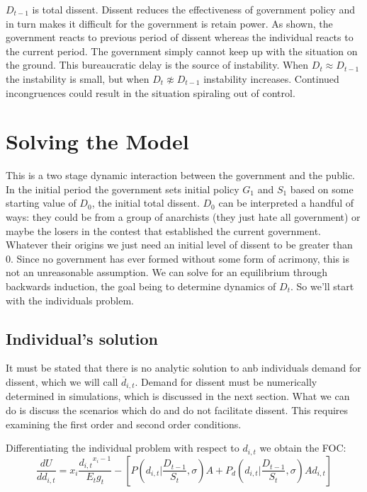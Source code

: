 \documentclass[12pt]{article}
\begin{document}
\begin{spacing}{1.5}
$D_{t-1}$ is total dissent. Dissent reduces the effectiveness of government policy and in turn makes it difficult for the government is retain power. As shown, the government reacts to previous period of dissent whereas the individual reacts to the current period. The government simply cannot keep up with the situation on the ground. This bureaucratic delay is the source of instability. When $D_t \approx D_{t-1}$ the instability is small, but when $D_t \not\approx D_{t-1}$ instability increases. Continued incongruences could result in the situation spiraling out of control. 


\section{Solving the Model}

This is a two stage dynamic interaction between the government and the public. In the initial period the government sets initial policy $G_1$ and $S_1$ based on some starting value of $D_0$, the initial total dissent. $D_0$ can be interpreted a handful of ways: they could be from a group of anarchists (they just hate all government) or maybe the losers in the contest that established the current government. Whatever their origins we just need an initial level of dissent to be greater than 0. Since no government has ever formed without some form of acrimony, this is not an unreasonable assumption. We can solve for an equilibrium through backwards induction, the goal being to determine dynamics of $D_t$. So we'll start with the individuals problem. 

\subsection{Individual's solution}

It must be stated that there is no analytic solution to anb individuals demand for dissent, which we will call $\overline{d}_{i,t}$. Demand for dissent must be numerically determined in simulations, which is discussed in the next section. What we can do is discuss the scenarios which do and do not facilitate dissent. This requires examining the first order and second order conditions.  

\noindent Differentiating the individual problem with respect to $d_{i,t}$ we obtain the FOC: 
\begin{equation}
\frac{dU}{dd_{i,t}} = x_i \frac{{d_{i,t}}^{x_i -1}}{E_t g_t} - \left[P\left(d_{i,t} \Biggl|\frac{D_{t-1}}{S_t},\sigma \right)A +  P_d \left(d_{i,t} \Biggl|\frac{D_{t-1}}{S_t},\sigma \right)Ad_{i,t} \right]
\end{equation}


\end{spacing}
\end{document}
